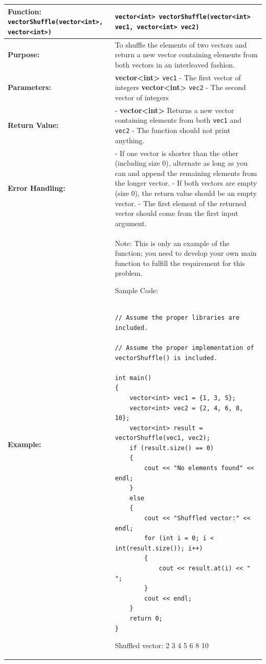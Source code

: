 \renewcommand{\arraystretch}{1.5} 
\begin{longtable}{|p{1.7in}|p{4.3in}|}
\hline
\textbf{Function:}  \texttt{vectorShuffle(vector<int>, vector<int>)}& \texttt{vector<int> vectorShuffle(vector<int> vec1, vector<int> vec2)}\\ \hline

\textbf{Purpose:} & To shuffle the elements of two vectors and return a new vector containing elements from both vectors in an interleaved fashion.\\ \hline

\textbf{Parameters:} & 
\textbf{vector<int>} \texttt{vec1} - The first vector of integers \newline
\textbf{vector<int>} \texttt{vec2} - The second vector of integers\\ \hline

\textbf{Return Value:} & 
- \textbf{vector<int>} Returns a new vector containing elements from both \texttt{vec1} and \texttt{vec2} 
\newline
- The function should not print anything.\\ \hline

\textbf{Error Handling:} & 
- If one vector is shorter than the other (including size 0), alternate as long as you can and append the remaining elements from the longer vector. \newline
- If both vectors are empty (size 0), the return value should be an empty vector. \newline
- The first element of the returned vector should come from the first input argument.\\ \hline

\textbf{Example:}& 

Note: This is only an example of the function; you need to develop your own main function to fulfill the requirement for this problem.

Sample Code:

\begin{example}
        \begin{verbatim}

// Assume the proper libraries are included.

// Assume the proper implementation of vectorShuffle() is included.

int main()
{
    vector<int> vec1 = {1, 3, 5};
    vector<int> vec2 = {2, 4, 6, 8, 10};
    vector<int> result = vectorShuffle(vec1, vec2);
    if (result.size() == 0)
    {
        cout << "No elements found" << endl;
    }
    else
    {
        cout << "Shuffled vector:" << endl;
        for (int i = 0; i < int(result.size()); i++)
        {
            cout << result.at(i) << " ";
        }
        cout << endl;
    }
    return 0;
}
        \end{verbatim}
        \end{example}

        \begin{sample}
Shuffled vector: \newline
1 2 3 4 5 6 8 10
        \end{sample}\\\hline
\end{longtable}
 
